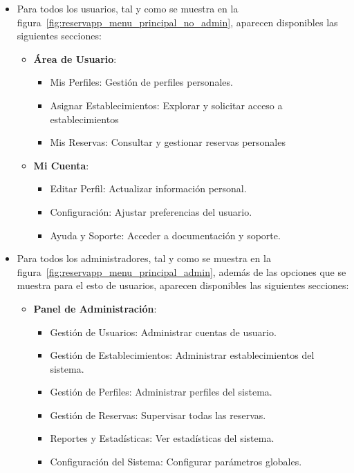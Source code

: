 \begin{itemize}
   \item Para todos los usuarios, tal y como se muestra en la figura~\ref{fig:reservapp_menu_principal_no_admin}, aparecen disponibles las siguientes secciones:
   \begin{itemize}
      \item \textbf{Área de Usuario}:
      \begin{itemize}
         \item Mis Perfiles: Gestión de perfiles personales.
         \item Asignar Establecimientos: Explorar y solicitar acceso a establecimientos
         \item Mis Reservas: Consultar y gestionar reservas personales
      \end{itemize}
      \item \textbf{Mi Cuenta}:
      \begin{itemize}
         \item Editar Perfil: Actualizar información personal.
         \item Configuración: Ajustar preferencias del usuario.
         \item Ayuda y Soporte: Acceder a documentación y soporte.
      \end{itemize}
   \end{itemize}
   \item Para todos los administradores, tal y como se muestra en la figura~\ref{fig:reservapp_menu_principal_admin}, además de las opciones que se muestra para el esto de usuarios, aparecen disponibles las siguientes secciones:
   \begin{itemize}
      \item \textbf{Panel de Administración}:
      \begin{itemize}
         \item Gestión de Usuarios: Administrar cuentas de usuario.
         \item Gestión de Establecimientos: Administrar establecimientos del sistema.
         \item Gestión de Perfiles: Administrar perfiles del sistema.
         \item Gestión de Reservas: Supervisar todas las reservas.
         \item Reportes y Estadísticas: Ver estadísticas del sistema.
         \item Configuración del Sistema: Configurar parámetros globales.
      \end{itemize}
   \end{itemize}
\end{itemize}

